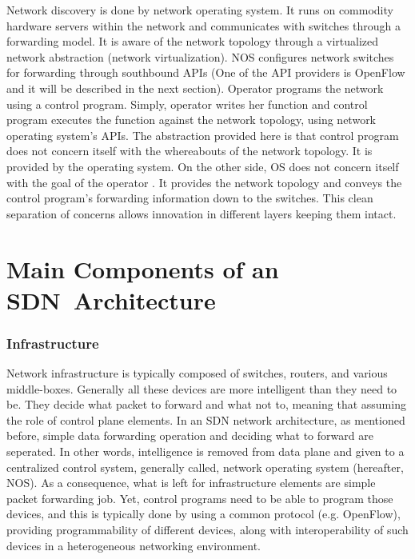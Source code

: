 \documentclass[12pt,journal,compsoc]{IEEEtran}
\begin{document}
Network discovery is done by network operating system. It runs on commodity 
hardware servers within the network and communicates with switches through 
a forwarding model. It is aware of the network topology through a 
virtualized network abstraction (network virtualization). NOS 
configures network switches for forwarding through southbound APIs 
(One of the API providers is OpenFlow and it will be described 
in the next section). Operator programs the network using a control 
program. Simply, operator writes her function and control 
program executes the function against the network topology, using 
network operating system’s APIs. The abstraction provided here is 
that control program does not concern itself with the whereabouts of 
the network topology. It is provided by the operating system. 
On the other side, OS does not concern itself with the goal of 
the operator \cite{gude}. It provides the network topology and conveys the control 
program’s forwarding information down to the switches. 
This clean separation of concerns allows innovation in different 
layers keeping them intact. 



\section{Main Components of an SDN~Architecture}

\subsubsection{Infrastructure}
Network infrastructure is typically composed of switches, routers, and various middle-boxes.
Generally all these devices are more intelligent than they need to be. They decide what
packet to forward and what not to, meaning that assuming the role of control plane elements.
In an SDN network architecture, as mentioned before, simple data forwarding operation and 
deciding what to forward are seperated. In other words, intelligence is removed from data 
plane and given to a centralized control system, generally called, network operating system 
(hereafter, NOS). As a consequence, what is left for infrastructure elements are simple 
packet forwarding job. Yet, control programs need to be able to program those devices, 
and this is typically done by using a common protocol (e.g. OpenFlow), providing 
programmability of different devices, along with interoperability of such devices 
in a heterogeneous networking environment.
\end{document}
